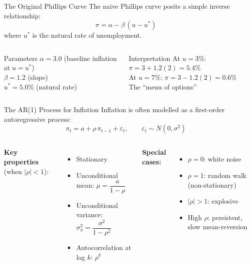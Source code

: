 \documentclass[aspectratio=169, 10pt]{beamer}
\begin{document}
\begin{frame}{The Original Phillips Curve}
The naive Phillips curve posits a simple inverse relationship:
\[
  \pi = \alpha - \beta\,(u - u^*)
\]
where $u^*$ is the natural rate of unemployment.
\vspace{0.5em}
\begin{columns}[T]
\begin{block}{Parameters}
  $\alpha = 3.0$ (baseline inflation at $u = u^*$)\\
  $\beta = 1.2$ (slope)\\
  $u^* = 5.0\%$ (natural rate)
\end{block}
\begin{block}{Interpretation}
  At $u = 3\%$: $\pi = 3 + 1.2(2) = 5.4\%$\\
  At $u = 7\%$: $\pi = 3 - 1.2(2) = 0.6\%$\\
  The ``menu of options''
\end{block}
\end{columns}
\end{frame}

\begin{frame}{The AR(1) Process for Inflation}
Inflation is often modelled as a first-order autoregressive process:
\[
  \pi_t = a + \rho\,\pi_{t-1} + \varepsilon_t, \qquad
  \varepsilon_t \sim N(0, \sigma^2)
\]
\vspace{0.3em}
\begin{columns}[T]
\textbf{Key properties} (when $|\rho| < 1$):
\begin{itemize}
  \item Stationary
  \item Unconditional mean: $\mu = \dfrac{a}{1 - \rho}$
  \item Unconditional variance: $\sigma^2_\pi = \dfrac{\sigma^2}{1 - \rho^2}$
  \item Autocorrelation at lag $k$: $\rho^k$
\end{itemize}
\textbf{Special cases:}
\begin{itemize}
  \item $\rho = 0$: white noise
  \item $\rho = 1$: random walk (non-stationary)
  \item $|\rho| > 1$: explosive
  \item High $\rho$: persistent, slow mean-reversion
\end{itemize}
\end{columns}
\end{frame}
\end{document}
